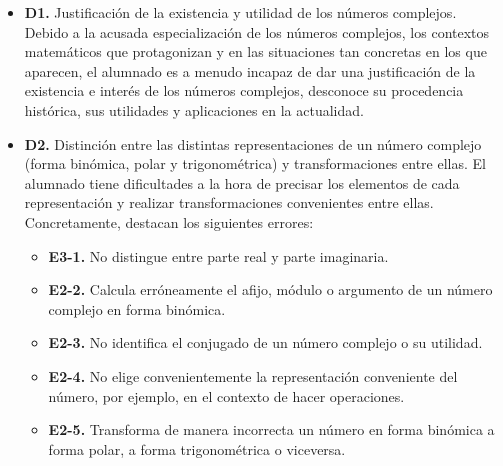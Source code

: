 \documentclass[../main.tex]{memoir}
\begin{document}
\begin{itemize}
	\item \textbf{D1.} Justificación de la existencia y utilidad de los números complejos. \\
		Debido a la acusada especialización de los números complejos, los contextos matemáticos que protagonizan y en las situaciones tan concretas en los que aparecen, el alumnado es a menudo incapaz de dar una justificación de la existencia e interés de los números complejos, desconoce su procedencia histórica, sus utilidades y aplicaciones en la actualidad.
		
	\item \textbf{D2.} Distinción entre las distintas representaciones de un número complejo (forma binómica, polar y trigonométrica) y transformaciones entre ellas.
	El alumnado tiene dificultades a la hora de precisar los elementos de cada representación y realizar transformaciones convenientes entre ellas. Concretamente, destacan los siguientes errores:
	\begin{itemize}
		\item \textbf{E3-1.} No distingue entre parte real y parte imaginaria.
		\item \textbf{E2-2.} Calcula erróneamente el afijo, módulo o argumento de un número complejo en forma binómica.
		\item \textbf{E2-3.} No identifica el conjugado de un número complejo o su utilidad.
		\item \textbf{E2-4.} No elige convenientemente la representación conveniente del número, por ejemplo, en el contexto de hacer operaciones.
		\item \textbf{E2-5.} Transforma de manera incorrecta un número en forma binómica a forma polar, a  forma trigonométrica o viceversa.
	\end{itemize}
	

\end{itemize}
\end{document}
